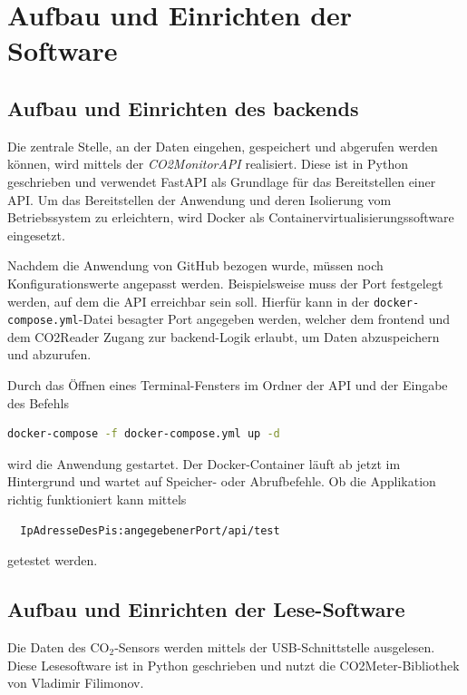 \documentclass[a4paper,
    11pt,
    headings=small,
    ngerman,
    listof=totoc,
    numbers=noenddot]{scrreprt}[2021/11/13]
\begin{document}
\section{Aufbau und Einrichten der Software}

\subsection{Aufbau und Einrichten des \gls{backend}s}

Die zentrale Stelle, an der Daten eingehen, gespeichert und abgerufen werden können, wird mittels der \textit{CO2MonitorAPI} realisiert. Diese ist in \gls{Python} geschrieben und verwendet FastAPI als Grundlage für das Bereitstellen einer API. Um das Bereitstellen der Anwendung und deren  Isolierung vom Betriebssystem zu erleichtern, wird \gls{Docker} als Containervirtualisierungssoftware eingesetzt.

Nachdem die Anwendung von GitHub bezogen wurde, müssen noch Konfigurationswerte angepasst werden. Beispielsweise muss der Port festgelegt werden, auf dem die \ac{API} erreichbar sein soll. Hierfür kann in der \texttt{docker-compose.yml}-Datei besagter Port angegeben werden, welcher dem \gls{frontend} und dem CO2Reader Zugang zur \gls{backend}-Logik erlaubt, um Daten abzuspeichern und abzurufen.

Durch das Öffnen eines Terminal-Fensters im Ordner der \ac{API} und der Eingabe des Befehls

\begin{lstlisting}[language=Bash]
  docker-compose -f docker-compose.yml up -d
\end{lstlisting}

wird die Anwendung gestartet. Der \gls{Docker}-Container läuft ab jetzt im Hintergrund und wartet auf Speicher- oder Abrufbefehle. Ob die Applikation richtig funktioniert kann mittels

\begin{lstlisting}
  IpAdresseDesPis:angegebenerPort/api/test
\end{lstlisting}

getestet werden.


\subsection{Aufbau und Einrichten der Lese-Software}

Die Daten des CO$_2$-Sensors werden mittels der USB-Schnittstelle ausgelesen. Diese Lesesoftware ist in \gls{Python} geschrieben und nutzt die CO2Meter-Bibliothek von Vladimir Filimonov.
\autocite{github_co2meter}
\end{document}
